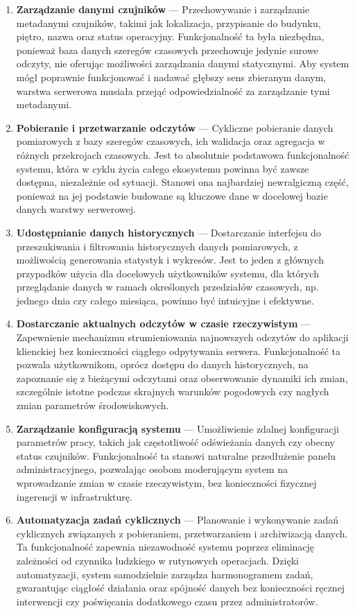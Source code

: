 \documentclass[a4paper,12pt,openany]{book}
\begin{document}
\begin{enumerate}
  \item \textbf{Zarządzanie danymi czujników} --- Przechowywanie i zarządzanie metadanymi czujników, takimi jak lokalizacja, przypisanie do budynku, piętro, nazwa oraz status operacyjny. Funkcjonalność ta była niezbędna, ponieważ baza danych szeregów czasowych przechowuje jedynie surowe odczyty, nie oferując możliwości zarządzania danymi statycznymi. Aby system mógł poprawnie funkcjonować i nadawać głębszy sens zbieranym danym, warstwa serwerowa musiała przejąć odpowiedzialność za zarządzanie tymi metadanymi.

  \item \textbf{Pobieranie i przetwarzanie odczytów} --- Cykliczne pobieranie danych pomiarowych z bazy szeregów czasowych, ich walidacja oraz agregacja w różnych przekrojach czasowych. Jest to absolutnie podstawowa funkcjonalność systemu, która w cyklu życia całego ekosystemu powinna być zawsze dostępna, niezależnie od sytuacji. Stanowi ona najbardziej newralgiczną część, ponieważ na jej podstawie budowane są kluczowe dane w docelowej bazie danych warstwy serwerowej.

  \item \textbf{Udostępnianie danych historycznych} --- Dostarczanie interfejsu do przeszukiwania i filtrowania historycznych danych pomiarowych, z możliwością generowania statystyk i wykresów. Jest to jeden z głównych przypadków użycia dla docelowych użytkowników systemu, dla których przeglądanie danych w ramach określonych przedziałów czasowych, np. jednego dnia czy całego miesiąca, powinno być intuicyjne i efektywne.

  \item \textbf{Dostarczanie aktualnych odczytów w czasie rzeczywistym} --- Zapewnienie mechanizmu strumieniowania najnowszych odczytów do aplikacji klienckiej bez konieczności ciągłego odpytywania serwera. Funkcjonalność ta pozwala użytkownikom, oprócz dostępu do danych historycznych, na zapoznanie się z bieżącymi odczytami oraz obserwowanie dynamiki ich zmian, szczególnie istotne podczas skrajnych warunków pogodowych czy nagłych zmian parametrów środowiskowych.

  \item \textbf{Zarządzanie konfiguracją systemu} --- Umożliwienie zdalnej konfiguracji parametrów pracy, takich jak częstotliwość odświeżania danych czy obecny status czujników. Funkcjonalność ta stanowi naturalne przedłużenie panelu administracyjnego, pozwalając osobom moderującym system na wprowadzanie zmian w czasie rzeczywistym, bez konieczności fizycznej ingerencji w infrastrukturę.

  \item \textbf{Automatyzacja zadań cyklicznych} --- Planowanie i wykonywanie zadań cyklicznych związanych z pobieraniem, przetwarzaniem i archiwizacją danych. Ta funkcjonalność zapewnia niezawodność systemu poprzez eliminację zależności od czynnika ludzkiego w rutynowych operacjach. Dzięki automatyzacji, system samodzielnie zarządza harmonogramem zadań, gwarantując ciągłość działania oraz spójność danych bez konieczności ręcznej interwencji czy poświęcania dodatkowego czasu przez administratorów.
\end{enumerate}
\end{document}
